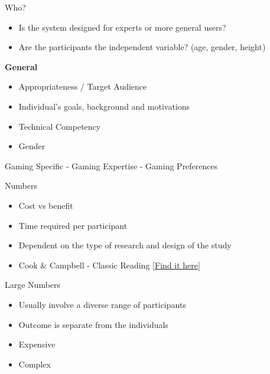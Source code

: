 \documentclass[ignorenonframetext,]{beamer}
\providecommand{\tightlist}{%
  \setlength{\itemsep}{0pt}\setlength{\parskip}{0pt}}
\begin{document}
\begin{frame}{Who?}

\begin{itemize}
\tightlist
\item
  Is the system designed for experts or more general users?
\item
  Are the participants the independent variable? (age, gender, height)
\end{itemize}

\textbf{General}

\begin{itemize}
\tightlist
\item
  Appropriateness / Target Audience
\item
  Individual's goals, background and motivations
\item
  Technical Competency
\item
  Gender
\end{itemize}

Gaming Specific - Gaming Expertise - Gaming Preferences

\end{frame}

\begin{frame}{Numbers}

\begin{itemize}
\tightlist
\item
  Cost vs benefit
\item
  Time required per participant
\item
  Dependent on the type of research and design of the study
\item
  Cook \& Campbell - Classic Reading
  \href{https://moodle2.units.it/pluginfile.php/132646/mod_resource/content/1/Estratto_ShadishCookCampbellExperimental2002.pdf}{{[}Find
  it here{]}}
\end{itemize}

\end{frame}

\begin{frame}{Large Numbers}

\begin{itemize}
\tightlist
\item
  Usually involve a diverse range of participants
\item
  Outcome is separate from the individuals
\item
  Expensive
\item
  Complex
\end{itemize}

\end{frame}
\end{document}
